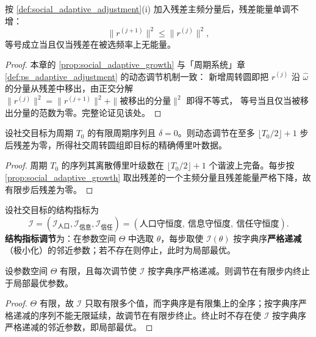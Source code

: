 \begin{proposition}[数量调节的单调性]\label{prop:social_adaptive_growth}
按 \cref{def:social_adaptive_adjustment}(i) 加入残差主频分量后，残差能量单调不增：
\[
\|r^{(j+1)}\|^2\le\|r^{(j)}\|^2,
\]
等号成立当且仅当残差在被选频率上无能量。
\end{proposition}

\begin{proof}
本章的 \cref{prop:social_adaptive_growth} 与「周期系统」章 \cref{def:ps_adaptive_adjustment} 的动态调节机制一致：
新增周转圆即把 $r^{(j)}$ 沿 $\hat\omega$ 的分量从残差中移出，由正交分解
$\|r^{(j)}\|^2=\|r^{(j+1)}\|^2+\|\text{被移出的分量}\|^2$ 即得不等式，
等号当且仅当被移出分量的范数为零。完整论证见该处。
\end{proof}

\begin{theorem}[动态调节的收敛性]\label{thm:social_adaptive_convergence}
设社交目标为周期 $T_0$ 的有限周期序列且 $\delta=0$。则动态调节在至多 $\lfloor T_0/2\rfloor+1$ 步后残差为零，所得社交周转圆组即目标的精确傅里叶数据。
\end{theorem}

\begin{proof}
周期 $T_0$ 的序列其离散傅里叶级数在 $\lfloor T_0/2\rfloor+1$ 个谐波上完备。每步按 \cref{prop:social_adaptive_growth} 取出残差的一个主频分量且残差能量严格下降，故有限步后残差为零。
\end{proof}

\begin{definition}[结构指标调节]\label{def:social_structure_metric_adjustment}
设社交目标的结构指标为
\[
\mathcal I=(\mathcal I_{\text{人口}},\mathcal I_{\text{信息}},\mathcal I_{\text{信任}})
=(\text{人口守恒度},\ \text{信息守恒度},\ \text{信任守恒度}).
\]
\textbf{结构指标调节}为：在参数空间 $\Theta$ 中选取 $\theta$，每步取使 $\mathcal I(\theta)$ 按字典序\textbf{严格递减}（极小化）的邻近参数；若不存在则停止，此时为局部最优。
\end{definition}

\begin{proposition}[结构指标调节的有限收敛]\label{prop:social_structure_metric_convergence}
设参数空间 $\Theta$ 有限，且每次调节使 $\mathcal I$ 按字典序严格递减。则调节在有限步内终止于局部最优参数。
\end{proposition}

\begin{proof}
$\Theta$ 有限，故 $\mathcal I$ 只取有限多个值，而字典序是有限集上的全序；按字典序严格递减的序列不能无限延续，故调节在有限步终止。终止时不存在使 $\mathcal I$ 按字典序严格递减的邻近参数，即局部最优。
\end{proof}

